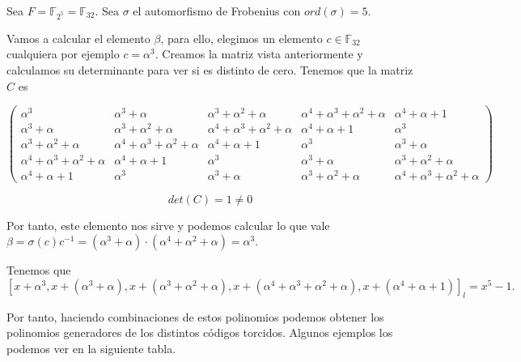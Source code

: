 \begin{exampleth}
 Sea $F = \mathbb{F}_{2^5} = \mathbb{F}_{32}$. Sea $\sigma$ el automorfismo de Frobenius con $ord(\sigma) = 5$.

Vamos a calcular el elemento $\beta$, para ello, elegimos un elemento $c \in \mathbb{F}_{32}$ cualquiera por ejemplo $c=\alpha^3$. Creamos la matriz vista anteriormente y calculamos su determinante para ver si es distinto de cero. Tenemos que la matriz $C$ es


\[
 \left( \begin{array}{ccccc}
	\alpha^3 & \alpha^3+\alpha & \alpha^3 + \alpha^2 + \alpha & \alpha^4 +\alpha^3 + \alpha^2 + \alpha & \alpha^4 + \alpha + 1 \\
	\alpha^3+\alpha & \alpha^3 + \alpha^2 + \alpha & \alpha^4 +\alpha^3 + \alpha^2 + \alpha &  \alpha^4 + \alpha + 1 & \alpha^3  \\ 
	\alpha^3 + \alpha^2 + \alpha & \alpha^4 +\alpha^3 + \alpha^2 + \alpha & \alpha^4 + \alpha + 1 & \alpha^3 & \alpha^3+\alpha \\ 
   \alpha^4 +\alpha^3 + \alpha^2 + \alpha & \alpha^4 + \alpha + 1 & \alpha^3 & \alpha^3+\alpha & \alpha^3 + \alpha^2 + \alpha \\
   \alpha^4 + \alpha + 1 & \alpha^3 & \alpha^3+\alpha & \alpha^3 + \alpha^2 + \alpha & \alpha^4 +\alpha^3 + \alpha^2 + \alpha
			\end{array} 
	\right)
\]

\[ det(C) = 1 \neq 0 \]

Por tanto, este elemento nos sirve y podemos calcular lo que vale $\beta = \sigma(c)c^{-1} = (\alpha^3 + \alpha) \cdot (\alpha^4 + \alpha^2 + \alpha) = \alpha^3$.

Tenemos que 
\[ [x+\alpha^3,x+(\alpha^3+\alpha),x+(\alpha^3 + \alpha^2 + \alpha),x+(\alpha^4 +\alpha^3 + \alpha^2 + \alpha),x+(\alpha^4 + \alpha + 1)]_l = x^5-1. \]

Por tanto, haciendo combinaciones de estos polinomios podemos obtener los polinomios generadores de los distintos códigos torcidos. Algunos ejemplos los podemos ver en la siguiente tabla.


\end{exampleth}
